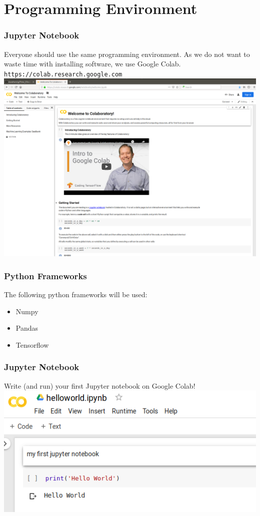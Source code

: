 \section{Programming Environment}

\begin{frame}[fragile]
  \frametitle{Jupyter Notebook}
  Everyone should use the same programming environment. As we do not want to waste time with
  installing software, we use Google Colab.\\
  \verb|https://colab.research.google.com|\\
  \vspace{3mm}
  \includegraphics[scale=0.1]{img/jupyter_notebook}
\end{frame}


\begin{frame}[fragile]
  \frametitle{Python Frameworks}
  The following python frameworks will be used:
  \begin{itemize}
  \item Numpy
  \item Pandas
  \item Tensorflow
  \end{itemize}
\end{frame}

\begin{frame}[fragile]
  \frametitle{Jupyter Notebook}
  \begin{exercise}
  Write (and run) your first Jupyter notebook on Google Colab!
  \includegraphics[scale=0.5]{img/jupyter_notebook_exercise}
  \end{exercise}
\end{frame}


